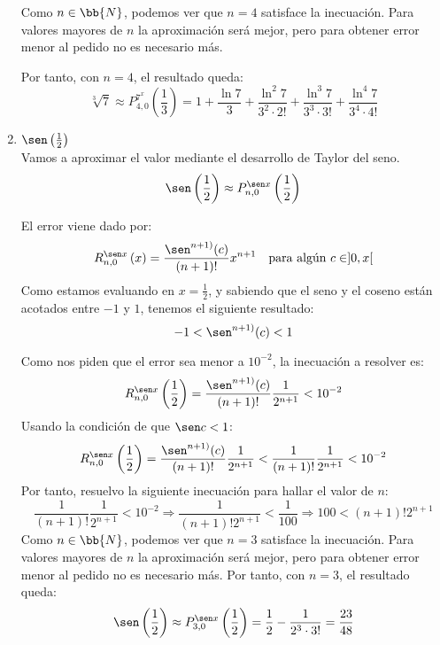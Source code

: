 \begin{ejercicio}
\begin{enumerate}
        Como $n\in \bb{N}$, podemos ver que $n=4$ satisface la inecuación. Para valores mayores de $n$ la aproximación será mejor, pero para obtener error menor al pedido no es necesario más.
        
        Por tanto, con $n=4$, el resultado queda:
        $$\sqrt[3]{7}\approx P_{4, 0}^{7^x}\left(\frac{1}{3}\right) = 1 + \frac{\ln 7}{3} + \frac{\ln^2 7}{3^2 \cdot 2!} + \frac{\ln^3 7}{3^3 \cdot 3!} + \frac{\ln^4 7}{3^4 \cdot 4!}$$

        
        \item $\sen\left( \frac{1}{2} \right)$\\
        Vamos a aproximar el valor mediante el desarrollo de Taylor del seno.
        $$\sen\left( \frac{1}{2} \right) \approx P_{n, 0}^{\sen x}\left(\frac{1}{2}\right)$$

        El error viene dado por:
        \begin{equation*}
            R_{n,0}^{\sen x}\left(x\right) = \frac{\sen^{n+1)} (c)}{(n+1)!}x^{n+1} \quad \text{para algún } c\in ]0, x[
        \end{equation*}
        Como estamos evaluando en $x=\frac{1}{2}$, y sabiendo que el seno y el coseno están acotados entre $-1$ y $1$, tenemos el siguiente resultado:
        \begin{equation*}
            -1 < \sen^{n+1)} (c) < 1
        \end{equation*}

        Como nos piden que el error sea menor a $10^{-2}$, la inecuación a resolver es:
        \begin{equation*}
            R_{n,0}^{\sen x}\left(\frac{1}{2}\right) = \frac{\sen^{n+1)} (c)}{(n+1)!}\frac{1}{2^{n+1}} < 10^{-2}
        \end{equation*}
        Usando la condición de que $\sen c < 1$:
        \begin{equation*}
            R_{n,0}^{\sen x}\left(\frac{1}{2}\right) = \frac{\sen^{n+1)} (c)}{(n+1)!}\frac{1}{2^{n+1}} < \frac{1}{(n+1)!}\frac{1}{2^{n+1}}  < 10^{-2}
        \end{equation*}
        Por tanto, resuelvo la siguiente inecuación para hallar el valor de $n$:
        \begin{equation*}
            \frac{1}{(n+1)!}\frac{1}{2^{n+1}}  < 10^{-2} \Longrightarrow \frac{1}{(n+1)!2^{n+1}} < \frac{1}{100} \Longrightarrow 100 < (n+1)!2^{n+1}
        \end{equation*}
        Como $n\in \bb{N}$, podemos ver que $n=3$ satisface la inecuación. Para valores mayores de $n$ la aproximación será mejor, pero para obtener error menor al pedido no es necesario más. Por tanto, con $n=3$, el resultado queda:
        $$\sen\left( \frac{1}{2} \right) \approx P_{3, 0}^{\sen x}\left(\frac{1}{2}\right) = \frac{1}{2} - \frac{1}{2^3 \cdot 3!} = \frac{23}{48}$$
        

\end{enumerate}
\end{ejercicio}
